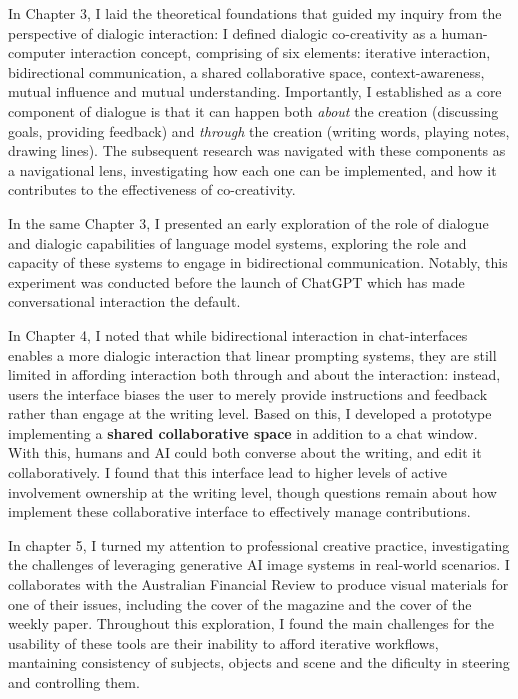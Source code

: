 In Chapter 3, I laid the theoretical foundations that guided my inquiry from the perspective of dialogic interaction: I defined dialogic co-creativity as a human-computer interaction concept, comprising of six elements: iterative interaction, bidirectional communication, a shared collaborative space, context-awareness, mutual influence and mutual understanding. Importantly, I established as a core component of dialogue is that it can happen both \textit{about} the creation (discussing goals, providing feedback) and \textit{through} the creation (writing words, playing notes, drawing lines). The subsequent research was navigated with these components as a navigational lens, investigating how each one can be implemented, and how it contributes to the effectiveness of co-creativity. 

In the same Chapter 3, I presented an early exploration of the role of dialogue and dialogic capabilities of language model systems, exploring the role and capacity of these systems to engage in bidirectional communication. Notably, this experiment was conducted before the launch of ChatGPT which has made conversational interaction the default. 

In Chapter 4, I noted that while bidirectional interaction in chat-interfaces enables a more dialogic interaction that linear prompting systems, they are still limited in affording interaction both through and about the interaction: instead, users the interface biases the user to merely provide instructions and feedback rather than engage at the writing level. Based on this, I developed a prototype implementing a \textbf{shared collaborative space} in addition to a chat window. With this, humans and AI could both converse about the writing, and edit it collaboratively. I found that this interface lead to higher levels of active involvement ownership at the writing level, though questions remain about how implement these collaborative interface to effectively manage contributions.

In chapter 5, I turned my attention to professional creative practice, investigating the challenges of leveraging generative AI image systems in real-world scenarios. I collaborates with the Australian Financial Review to produce visual materials for one of their issues, including the cover of the magazine and the cover of the weekly paper. Throughout this exploration, I found the main challenges for the usability of these tools are their inability to afford iterative workflows, mantaining consistency of subjects, objects and scene and the dificulty in steering and controlling them. 

